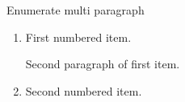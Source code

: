 \documentclass[14pt,t]{beamer-accessibility}
\begin{document}
\begin{frame}{Enumerate multi paragraph}
\begin{enumerate}
\item First numbered item.

  Second paragraph of first item.
\item Second numbered item.
\end{enumerate}
\end{frame}
\end{document}
